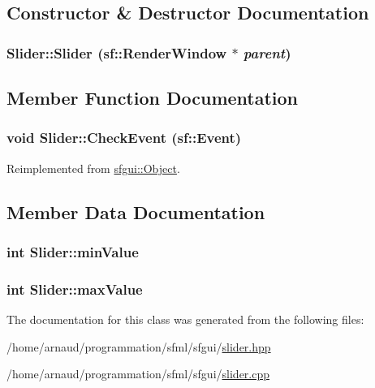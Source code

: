 \subsection{Constructor \& Destructor Documentation}
\hypertarget{classSlider_bb8697044794bd8fad17eb15e07f1498}{
\subsubsection[Slider]{\setlength{\rightskip}{0pt plus 5cm}Slider::Slider (sf::RenderWindow $\ast$ {\em parent})}}
\label{classSlider_bb8697044794bd8fad17eb15e07f1498}




\subsection{Member Function Documentation}
\hypertarget{classSlider_29b1b660a47bd4c2e2baaedf02a072c3}{
\subsubsection[CheckEvent]{\setlength{\rightskip}{0pt plus 5cm}void Slider::CheckEvent (sf::Event)}}
\label{classSlider_29b1b660a47bd4c2e2baaedf02a072c3}




Reimplemented from \hyperlink{classsfgui_1_1Object_cd9dbf2abe79e04c22f281bccb8bdb0e}{sfgui::Object}.

\subsection{Member Data Documentation}
\hypertarget{classSlider_8fe0e11428ca737232d6b71208345c3f}{
\subsubsection[minValue]{\setlength{\rightskip}{0pt plus 5cm}int {\bf Slider::minValue}}}
\label{classSlider_8fe0e11428ca737232d6b71208345c3f}


\hypertarget{classSlider_20045e1a9ab03ad6f36df2f07deffd39}{
\subsubsection[maxValue]{\setlength{\rightskip}{0pt plus 5cm}int {\bf Slider::maxValue}}}
\label{classSlider_20045e1a9ab03ad6f36df2f07deffd39}




The documentation for this class was generated from the following files:\begin{CompactItemize}
\item 
/home/arnaud/programmation/sfml/sfgui/\hyperlink{slider_8hpp}{slider.hpp}\item 
/home/arnaud/programmation/sfml/sfgui/\hyperlink{slider_8cpp}{slider.cpp}\end{CompactItemize}
